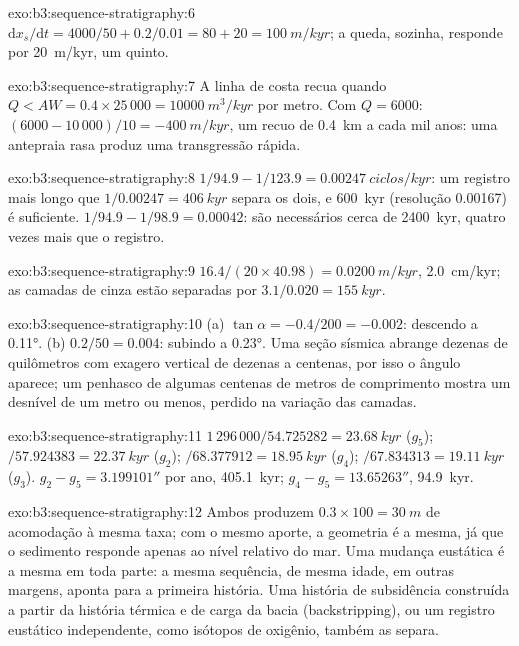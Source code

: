 \begin{solution}{exo:b3:sequence-stratigraphy:6}
$\mathrm dx_s/\mathrm dt = 4000/50 + 0.2/0.01 = 80 + 20 = \qty{100}{m/kyr}$;
a queda, sozinha, responde por \qty{20}{m/kyr}, um quinto.
\end{solution}

\begin{solution}{exo:b3:sequence-stratigraphy:7}
A linha de costa recua quando $Q < AW = 0.4\times25\,000 = \qty{10000}{m^3/kyr}$ por
metro. Com $Q = 6000$: $(6000 - 10\,000)/10 = \qty{-400}{m/kyr}$, um recuo
de \qty{0.4}{km} a cada mil anos: uma antepraia rasa produz uma
transgressão rápida.
\end{solution}

\begin{solution}{exo:b3:sequence-stratigraphy:8}
$1/94.9 - 1/123.9 = \qty{0.00247}{ciclos/kyr}$: um registro mais longo que
$1/0.00247 = \qty{406}{kyr}$ separa os dois, e \qty{600}{kyr} (resolução
0.00167) é suficiente. $1/94.9 - 1/98.9 = 0.00042$: são necessários cerca de
\qty{2400}{kyr}, quatro vezes mais que o registro.
\end{solution}

\begin{solution}{exo:b3:sequence-stratigraphy:9}
$16.4/(20\times40.98) = \qty{0.0200}{m/kyr}$, \qty{2.0}{cm/kyr}; as camadas de cinza
estão separadas por $3.1/0.020 = \qty{155}{kyr}$.
\end{solution}

\begin{solution}{exo:b3:sequence-stratigraphy:10}
(a) $\tan\alpha = -0.4/200 = -0.002$: descendo a \ang{0.11}. (b)
$0.2/50 = 0.004$: subindo a \ang{0.23}. Uma seção sísmica abrange dezenas de
quilômetros com exagero vertical de dezenas a centenas, por isso o ângulo aparece;
um penhasco de algumas centenas de metros de comprimento mostra um desnível de um metro ou menos, perdido na
variação das camadas.
\end{solution}

\begin{solution}{exo:b3:sequence-stratigraphy:11}
$1\,296\,000/54.725282 = \qty{23.68}{kyr}$ ($g_5$); $/57.924383 =
\qty{22.37}{kyr}$ ($g_2$); $/68.377912 = \qty{18.95}{kyr}$ ($g_4$);
$/67.834313 = \qty{19.11}{kyr}$ ($g_3$). $g_2 - g_5 = 3.199101''$ por ano,
\qty{405.1}{kyr}; $g_4 - g_5 = 13.65263''$, \qty{94.9}{kyr}.
\end{solution}

\begin{solution}{exo:b3:sequence-stratigraphy:12}
Ambos produzem $0.3\times100 = \qty{30}{m}$ de acomodação à mesma taxa; com
o mesmo aporte, a geometria é a mesma, já que o sedimento responde apenas ao
nível relativo do mar. Uma mudança eustática é a mesma em toda parte: a mesma
sequência, de mesma idade, em outras margens, aponta para a primeira história. Uma
história de subsidência construída a partir da história térmica e de carga da bacia
(backstripping), ou um registro eustático independente, como isótopos de oxigênio,
também as separa.
\end{solution}


